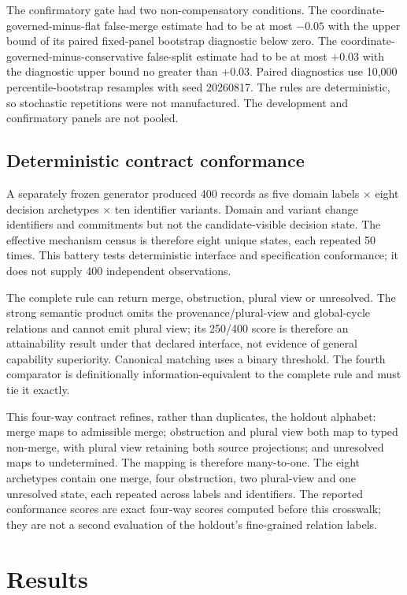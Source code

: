 The confirmatory gate had two non-compensatory conditions. The
coordinate-governed-minus-flat false-merge estimate had to be at most $-0.05$
with the upper bound of its paired fixed-panel bootstrap diagnostic below zero.
The coordinate-governed-minus-conservative false-split estimate had to be at
most $+0.03$ with the diagnostic upper bound no greater than $+0.03$. Paired
diagnostics use 10,000 percentile-bootstrap resamples with seed 20260817. The
rules are deterministic, so stochastic repetitions were not manufactured. The
development and confirmatory panels are not pooled.

\subsection{Deterministic contract conformance}

A separately frozen generator produced 400 records as five domain labels
$\times$ eight decision archetypes $\times$ ten identifier variants. Domain
and variant change identifiers and commitments but not the candidate-visible
decision state. The effective mechanism census is therefore eight unique
states, each repeated 50 times. This battery tests deterministic interface and
specification conformance; it does not supply 400 independent observations.

The complete rule can return merge, obstruction, plural view or unresolved.
The strong semantic product omits the provenance/plural-view
and global-cycle relations and cannot emit plural view; its 250/400 score is
therefore an attainability result under that declared interface, not evidence
of general capability superiority. Canonical matching uses a binary threshold.
The fourth comparator is definitionally information-equivalent to the complete
rule and must tie it exactly.

This four-way contract refines, rather than duplicates, the holdout alphabet:
merge maps to admissible merge; obstruction and plural view both map to typed
non-merge, with plural view retaining both source projections; and unresolved
maps to undetermined. The mapping is therefore many-to-one. The eight
archetypes contain one merge, four obstruction, two plural-view and one
unresolved state, each repeated across labels and identifiers. The reported
conformance scores are exact four-way scores computed before this crosswalk;
they are not a second evaluation of the holdout's fine-grained relation labels.

\section{Results}

